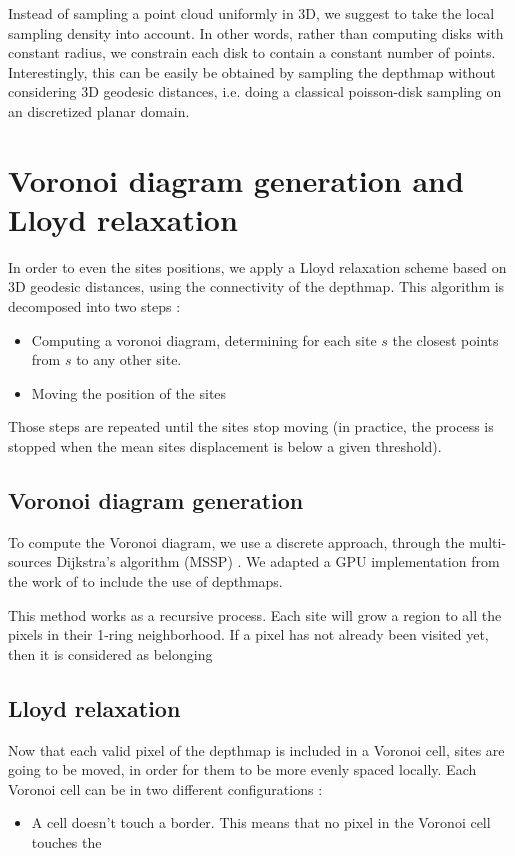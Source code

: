 \documentclass[11pt,fleqn]{book} %
\begin{document}
Instead of sampling a point cloud uniformly in 3D, we suggest to take the local sampling density into account. In other words, rather than computing disks with constant radius, we constrain each disk to contain a constant number of points.
Interestingly, this can be easily be obtained by sampling the depthmap without considering 3D geodesic distances, i.e. doing a classical poisson-disk sampling on an discretized planar domain.

\section{Voronoi diagram generation and Lloyd relaxation}
\label{sec:lloyd_relaxation}

In order to even the sites positions, we apply a Lloyd relaxation scheme based on 3D geodesic distances, using the connectivity of the depthmap.
This algorithm is decomposed into two steps : 
\begin{itemize}
	\item Computing a voronoi diagram, determining for each site $s$ the closest points from $s$ to any other site.
	\item Moving the position of the sites
\end{itemize}

Those steps are repeated until the sites stop moving (in practice, the process is stopped when the mean sites displacement is below a given threshold).

\subsection{Voronoi diagram generation}
To compute the Voronoi diagram, we use a discrete approach, through the multi-sources Dijkstra's algorithm (MSSP) \cite{Dij59}.
We adapted a GPU implementation from the work of \cite{PPA16} to include the use of depthmaps.

This method works as a recursive process. 
Each site will grow a region to all the pixels in their 1-ring neighborhood. If a pixel has not already been visited yet, then it is considered as belonging

\subsection{Lloyd relaxation}
Now that each valid pixel of the depthmap is included in a Voronoi cell, sites are going to be moved, in order for them to be more evenly spaced locally.
Each Voronoi cell can be in two different configurations : 
\begin{itemize}
	\item A cell doesn't touch a border. This means that no pixel in the Voronoi cell touches the 
\end{itemize}
\end{document}

